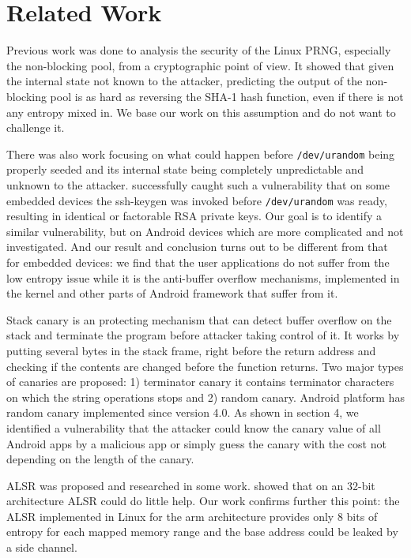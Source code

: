 \section{Related Work}


Previous work was done to analysis the security of the Linux PRNG, especially the non-blocking pool, \cite{Gutterman06} from a cryptographic point of view. It showed that given the internal state not known to the attacker, predicting the output of the non-blocking pool is as hard as reversing the SHA-1 hash function, even if there is not any entropy mixed in. We base our work on this assumption and do not want to challenge it. 

There was also work focusing on what could happen before \verb|/dev/urandom| being properly seeded and its internal state being completely unpredictable and unknown to the attacker. \cite{weakkeys12} successfully caught such a vulnerability that on some embedded devices the ssh-keygen was invoked before \verb|/dev/urandom| was ready, resulting in identical or factorable RSA private keys. Our goal is to identify a similar vulnerability, but on Android devices which are more complicated and not investigated. And our result and conclusion turns out to be different from that for embedded devices: we find that the user applications do not suffer from the low entropy issue while it is the anti-buffer overflow mechanisms, implemented in the kernel and other parts of Android framework that suffer from it.

Stack canary \cite{Cowan98} is an protecting mechanism that can detect buffer overflow on the stack and terminate the program before attacker taking control of it. It works by putting several bytes in the stack frame, right before the return address and checking if the contents are changed before the function returns. Two major types of canaries are proposed: 1) terminator canary it contains terminator characters on which the string operations stops and 2) random canary. Android platform has random canary implemented since version 4.0. As shown in section 4, we identified a vulnerability that the attacker could know the canary value of all Android apps by a malicious app or simply guess the canary with the cost not depending on the length of the canary.

ALSR was proposed and researched in some work. \cite{Shacham04} showed that on an 32-bit architecture ALSR could do little help. Our work confirms further this point: the ALSR implemented in Linux for the arm architecture provides only 8 bits of entropy for each mapped memory range and the base address could be leaked by a side channel.


